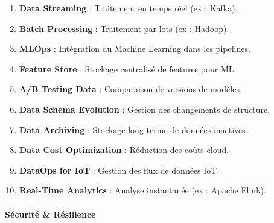\documentclass[
  letterpaper,
  DIV=11,
  numbers=noendperiod]{scrartcl}
\makeatletter
\let\oldparagraph\paragraph
\renewcommand{\paragraph}{
    \@ifstar
      \xxxParagraphStar
      \xxxParagraphNoStar
  }
\newcommand{\xxxParagraphStar}[1]{\oldparagraph*{#1}\mbox{}}
\newcommand{\xxxParagraphNoStar}[1]{\oldparagraph{#1}\mbox{}}
\providecommand{\tightlist}{%
  \setlength{\itemsep}{0pt}\setlength{\parskip}{0pt}}\usepackage{longtable,booktabs,array}
\makeatother
\begin{document}
\begin{enumerate}
\def\labelenumi{\arabic{enumi}.}
\setcounter{enumi}{50}
\tightlist
\item
  \textbf{Data Streaming} : Traitement en temps réel (ex : Kafka).\\
\item
  \textbf{Batch Processing} : Traitement par lots (ex : Hadoop).\\
\item
  \textbf{MLOps} : Intégration du Machine Learning dans les pipelines.\\
\item
  \textbf{Feature Store} : Stockage centralisé de features pour ML.\\
\item
  \textbf{A/B Testing Data} : Comparaison de versions de modèles.\\
\item
  \textbf{Data Schema Evolution} : Gestion des changements de
  structure.\\
\item
  \textbf{Data Archiving} : Stockage long terme de données inactives.\\
\item
  \textbf{Data Cost Optimization} : Réduction des coûts cloud.\\
\item
  \textbf{DataOps for IoT} : Gestion des flux de données IoT.\\
\item
  \textbf{Real-Time Analytics} : Analyse instantanée (ex : Apache
  Flink).
\end{enumerate}

\paragraph{\texorpdfstring{\textbf{Sécurité \&
Résilience}}{Sécurité \& Résilience}}\label{suxe9curituxe9-ruxe9silience}
\end{document}
